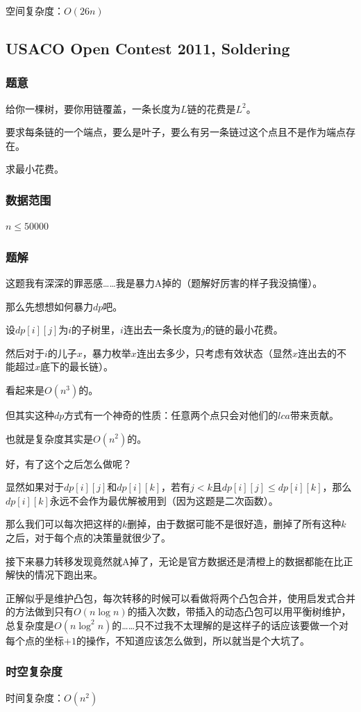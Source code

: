 \documentclass{ctexart}
\begin{document}
空间复杂度：$O(26n)$
\subsection{USACO Open Contest 2011, Soldering}
\subsubsection{题意}
给你一棵树，要你用链覆盖，一条长度为$L$链的花费是$L^2$。

要求每条链的一个端点，要么是叶子，要么有另一条链过这个点且不是作为端点存在。

求最小花费。
\subsubsection{数据范围}
$n \le 50000$
\subsubsection{题解}
这题我有深深的罪恶感……我是暴力A掉的（题解好厉害的样子我没搞懂）。

那么先想想如何暴力$dp$吧。

设$dp[i][j]$为$i$的子树里，$i$连出去一条长度为$j$的链的最小花费。

然后对于$i$的儿子$x$，暴力枚举$x$连出去多少，只考虑有效状态（显然$x$连出去的不能超过$x$底下的最长链）。

看起来是$O(n^3)$的。

但其实这种$dp$方式有一个神奇的性质：任意两个点只会对他们的$lca$带来贡献。

也就是复杂度其实是$O(n^2)$的。

好，有了这个之后怎么做呢？

显然如果对于$dp[i][j]$和$dp[i][k]$，若有$j<k$且$dp[i][j] \le dp[i][k]$，那么$dp[i][k]$永远不会作为最优解被用到（因为这题是二次函数）。

那么我们可以每次把这样的$k$删掉，由于数据可能不是很好造，删掉了所有这种$k$之后，对于每个点的决策量就很少了。

接下来暴力转移发现竟然就A掉了，无论是官方数据还是清橙上的数据都能在比正解快的情况下跑出来。

正解似乎是维护凸包，每次转移的时候可以看做将两个凸包合并，使用启发式合并的方法做到只有$O(n \log n)$的插入次数，带插入的动态凸包可以用平衡树维护，总复杂度是$O(n \log^2 n)$的……只不过我不太理解的是这样子的话应该要做一个对每个点的坐标$+1$的操作，不知道应该怎么做到，所以就当是个大坑了。
\subsubsection{时空复杂度}
时间复杂度：$O(n^2)$
\end{document}
